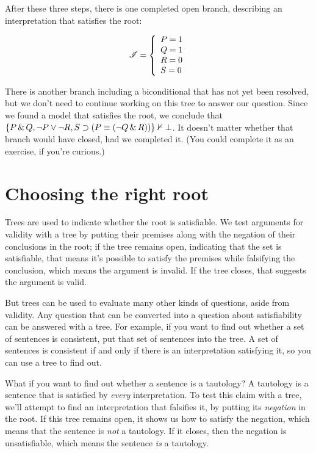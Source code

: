 After these three steps, there is one completed open branch, describing an interpretation that satisfies the root: 

\begin{displaymath}
\mathscr{I} =
\left\{
	\begin{array}{ll}
	P = 1\\
	Q = 1\\
	R = 0\\
	S = 0
	\end{array}
\right.
\end{displaymath}

There is another branch including a biconditional that has not yet been resolved, but we don't need to continue working on this tree to answer our question. Since we found a model that satisfies the root, we conclude that $\{P \,\&\, Q, \neg P \vee \neg R, S \supset (P \equiv (\neg Q \,\&\, R))\} \nvdash{}\bot$. It doesn't matter whether that branch would have closed, had we completed it. (You could complete it as an exercise, if you're curious.)

\section{Choosing the right root}
\label{sec.sl.treeroots}

Trees are used to indicate whether the root is satisfiable. We test arguments for validity with a tree by putting their premises along with the negation of their conclusions in the root; if the tree remains open, indicating that the set is satisfiable, that means it's possible to satisfy the premises while falsifying the conclusion, which means the argument is invalid. If the tree closes, that suggests the argument is valid.

But trees can be used to evaluate many other kinds of questions, aside from validity. Any question that can be converted into a question about satisfiability can be answered with a tree. For example, if you want to find out whether a set of sentences is consistent, put that set of sentences into the tree. A set of sentences is consistent if and only if there is an interpretation satisfying it, so you can use a tree to find out.

What if you want to find out whether a sentence is a tautology? A tautology is a sentence that is satisfied by \emph{every} interpretation. To test this claim with a tree, we'll attempt to find an interpretation that falsifies it, by putting its \emph{negation} in the root. If this tree remains open, it shows us how to satisfy the negation, which means that the sentence is \emph{not} a tautology. If it closes, then the negation is unsatisfiable, which means the sentence \emph{is} a tautology.

